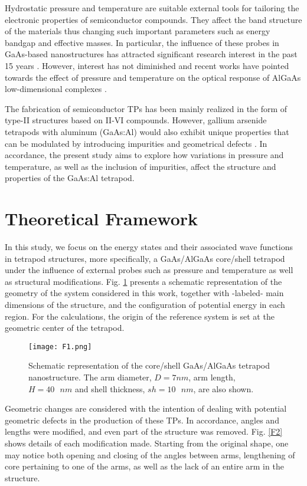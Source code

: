 \documentclass[nanomaterials,article,submit,moreauthors,pdftex]{Definitions/mdpi}
\begin{document}
Hydrostatic pressure and temperature are suitable external tools for tailoring the electronic properties of semiconductor compounds. They affect the band structure of the materials thus changing such important parameters such as energy bandgap and effective masses. In particular, the influence of these probes in GaAs-based nanostructures has attracted significant research interest in the past 15 years \cite{Sivakami2013}. However, interest has not diminished and recent works have pointed towards the effect of pressure and temperature on the optical response of AlGaAs low-dimensional complexes \cite{Arely2023,Belen2024}.

The fabrication of semiconductor TPs has been mainly realized in the form of type-II structures based on II-VI compounds. However, gallium arsenide tetrapods with aluminum (GaAs:Al) would also exhibit unique properties that can be modulated by introducing impurities and geometrical defects \cite{Hahn2024}. In accordance, the present study aims to explore how variations in pressure and temperature, as well as the inclusion of impurities, affect the structure and properties of the GaAs:Al tetrapod.
 

\section{Theoretical Framework} \label{theory}
In this study, we focus on the energy states and their associated wave functions in tetrapod structures, more specifically, a GaAs/AlGaAs core/shell tetrapod under the influence of external probes such as pressure and temperature as well as structural modifications. Fig. \ref{F1} presents a schematic representation of the geometry of the system considered in this work, together with -labeled- main dimensions of the structure, and the configuration of potential energy in each region. For the calculations, the origin of the reference system is set at the geometric center of the tetrapod.

\begin{figure}[H]
    \centering
    \texttt{[image: F1.png]}
    \caption{Schematic representation of the core/shell GaAs/AlGaAs tetrapod nanostructure. The arm diameter, $D = 7 nm$, arm length, $H = 40\text{ }nm$ and shell thickness, $sh = 10\text{ }nm$, are also shown.}
    \label{F1}
\end{figure}

Geometric changes are considered with the intention of dealing with potential geometric defects in the production of these TPs. In accordance, angles and lengths were modified, and even part of the structure was removed. Fig. \ref{F2} shows details of each modification made. Starting from the original shape, one may notice both opening and closing of the angles between arms, lengthening of core pertaining to one of the arms, as well as the lack of an entire arm in the structure.
\end{document}
